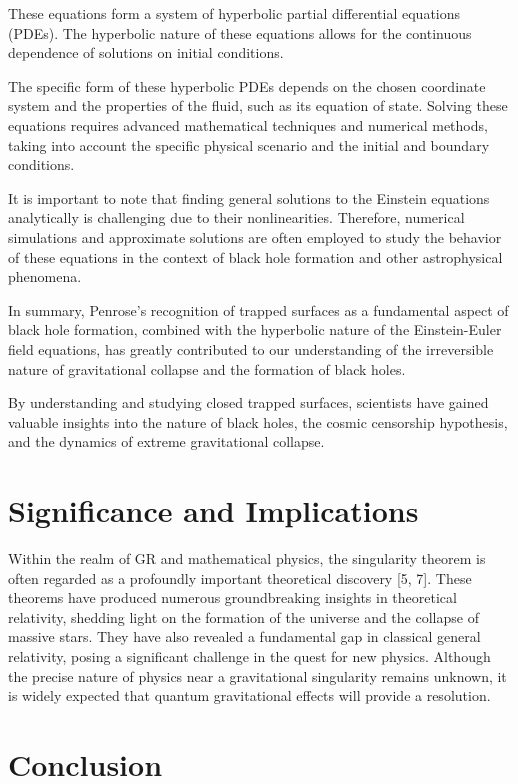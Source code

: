 \documentclass{article}
\begin{document}
These equations form a system of hyperbolic partial differential equations (PDEs). The hyperbolic nature of these equations allows for the continuous dependence of solutions on initial conditions.


The specific form of these hyperbolic PDEs depends on the chosen coordinate system and the properties of the fluid, such as its equation of state. Solving these equations requires advanced mathematical techniques and numerical methods, taking into account the specific physical scenario and the initial and boundary conditions.

It is important to note that finding general solutions to the Einstein equations analytically is challenging due to their nonlinearities. Therefore, numerical simulations and approximate solutions are often employed to study the behavior of these equations in the context of black hole formation and other astrophysical phenomena.

In summary, Penrose's recognition of trapped surfaces as a fundamental aspect of black hole formation, combined with the hyperbolic nature of the Einstein-Euler field equations, has greatly contributed to our understanding of the irreversible nature of gravitational collapse and the formation of black holes. 


By understanding and studying closed trapped surfaces, scientists have gained valuable insights into the nature of black holes, the cosmic censorship hypothesis, and the dynamics of extreme gravitational collapse. 



\section{\Large Significance and Implications}

\large 
Within the realm of GR and mathematical physics, the singularity theorem is often regarded as a profoundly important theoretical discovery [5, 7]. These theorems have produced numerous groundbreaking insights in theoretical relativity, shedding light on the formation of the universe and the collapse of massive stars. They have also revealed a fundamental gap in classical general relativity, posing a significant challenge in the quest for new physics. Although the precise nature of physics near a gravitational singularity remains unknown, it is widely expected that quantum gravitational effects will provide a resolution.


\section{\Large Conclusion}
\end{document}
